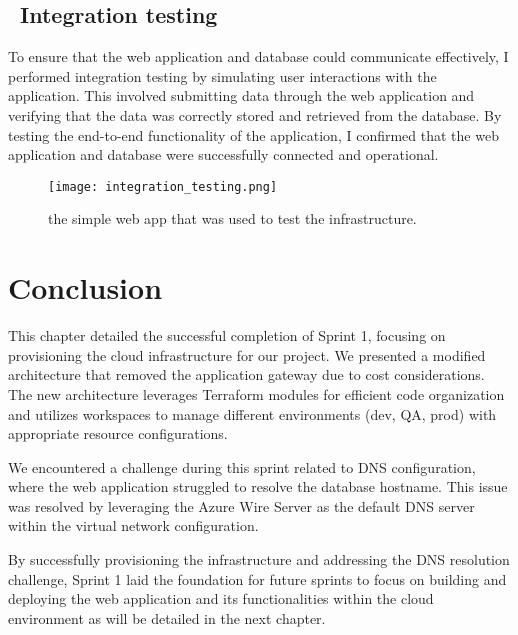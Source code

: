 \subsection*{ \textbullet\ Integration testing}
To ensure that the web application and database could communicate effectively, I performed integration testing by simulating user interactions with the application. This involved submitting data through the web application and verifying that the data was correctly stored and retrieved from the database. By testing the end-to-end functionality of the application, I confirmed that the web application and database were successfully connected and operational.
\begin{figure}[H]
    \centering
    \texttt{[image: integration\_testing.png]}
    \caption{the simple web app that was used to test the infrastructure.}
    \label{fig:testing}
\end{figure}

\section*{Conclusion}
This chapter detailed the successful completion of Sprint 1, focusing on provisioning the cloud infrastructure for our project. We presented a modified architecture that removed the application gateway due to cost considerations. The new architecture leverages Terraform modules for efficient code organization and utilizes workspaces to manage different environments (dev, QA, prod) with appropriate resource configurations.
\par
We encountered a challenge during this sprint related to DNS configuration, where the web application struggled to resolve the database hostname. This issue was resolved by leveraging the Azure Wire Server as the default DNS server within the virtual network configuration.
\par
By successfully provisioning the infrastructure and addressing the DNS resolution challenge, Sprint 1 laid the foundation for future sprints to focus on building and deploying the web application and its functionalities within the cloud environment as will be detailed in the next chapter.
